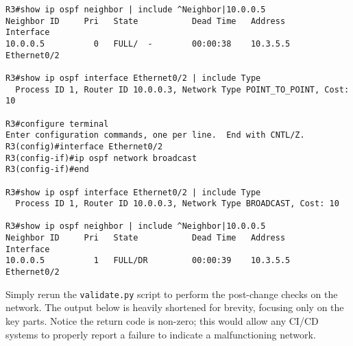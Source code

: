 \begin{verbatim}
R3#show ip ospf neighbor | include ^Neighbor|10.0.0.5
Neighbor ID     Pri   State           Dead Time   Address         Interface
10.0.0.5          0   FULL/  -        00:00:38    10.3.5.5        Ethernet0/2

R3#show ip ospf interface Ethernet0/2 | include Type
  Process ID 1, Router ID 10.0.0.3, Network Type POINT_TO_POINT, Cost: 10

R3#configure terminal
Enter configuration commands, one per line.  End with CNTL/Z.
R3(config)#interface Ethernet0/2
R3(config-if)#ip ospf network broadcast
R3(config-if)#end

R3#show ip ospf interface Ethernet0/2 | include Type
  Process ID 1, Router ID 10.0.0.3, Network Type BROADCAST, Cost: 10

R3#show ip ospf neighbor | include ^Neighbor|10.0.0.5
Neighbor ID     Pri   State           Dead Time   Address         Interface
10.0.0.5          1   FULL/DR         00:00:39    10.3.5.5        Ethernet0/2
\end{verbatim}

Simply rerun the \verb|validate.py| script to perform the post-change checks on
the network. The output below is heavily shortened for brevity, focusing only on
the key parts. Notice the return code is non-zero; this would allow any CI/CD
systems to properly report a failure to indicate a malfunctioning network.

